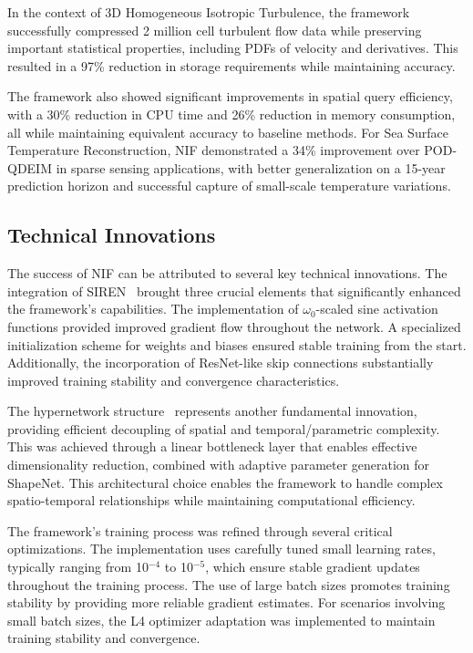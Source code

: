 \documentclass[10pt,journal,compsoc,onecolumn]{IEEEtran}
\begin{document}
In the context of 3D Homogeneous Isotropic Turbulence, the framework successfully compressed 2 million cell turbulent flow data while preserving important statistical properties, including PDFs of velocity and derivatives. This resulted in a 97\% reduction in storage requirements while maintaining accuracy.~\cite{nif2023}

The framework also showed significant improvements in spatial query efficiency, with a 30\% reduction in CPU time and 26\% reduction in memory consumption, all while maintaining equivalent accuracy to baseline methods. For Sea Surface Temperature Reconstruction, NIF demonstrated a 34\% improvement over POD-QDEIM in sparse sensing applications, with better generalization on a 15-year prediction horizon and successful capture of small-scale temperature variations.~\cite{nif2023}

\subsection{Technical Innovations}
The success of NIF can be attributed to several key technical innovations. The integration of SIREN~\cite{siren2020} brought three crucial elements that significantly enhanced the framework's capabilities. The implementation of $\omega_0$-scaled sine activation functions provided improved gradient flow throughout the network. A specialized initialization scheme for weights and biases ensured stable training from the start. Additionally, the incorporation of ResNet-like skip connections substantially improved training stability and convergence
characteristics.~\cite{nif2023}

The hypernetwork structure~\cite{hypernetworks2016} represents another fundamental innovation, providing efficient decoupling of spatial and temporal/parametric complexity. This was achieved through a linear bottleneck layer that enables effective dimensionality reduction, combined with adaptive parameter generation for ShapeNet. This architectural choice enables the framework to handle complex spatio-temporal relationships while maintaining computational efficiency.~\cite{nif2023}

The framework's training process was refined through several critical optimizations. The implementation uses carefully tuned small learning rates, typically ranging from 10$^{-4}$ to 10$^{-5}$, which ensure stable gradient updates throughout the training process. The use of large batch sizes promotes training stability by providing more reliable gradient estimates. For scenarios involving small batch sizes, the L4 optimizer adaptation was implemented to maintain training stability and convergence.~\cite{nif2023}
\end{document}
